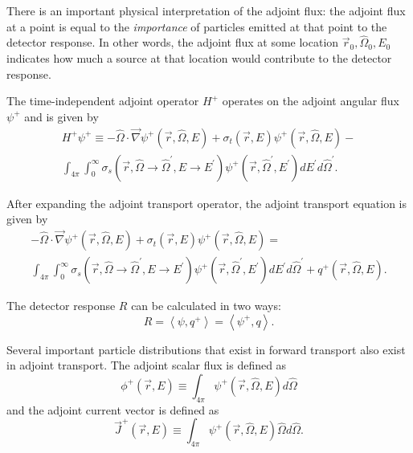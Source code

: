 There is an important physical interpretation of the adjoint flux: the adjoint flux at a point is equal to the \textit{importance} of particles emitted at that point to the detector response.
In other words, the adjoint flux at some location $\vec{r}_0, \hat{\Omega}_0, E_0$ indicates how much a source at that location would contribute to the detector response.

The time-independent adjoint operator $H^+$ operates on the adjoint angular flux $\psi^+$ and is given by
\begin{multline}\label{eq:bg:rt:transport-operator}
  H^+\psi^+ \equiv
  -\hat{\Omega}\cdot\vec{\nabla}\psi^+\left(\vec{r},\hat{\Omega},E\right) +
  \sigma_t\left(\vec{r},E\right)\psi^+\left(\vec{r},\hat{\Omega},E\right) - \\
  \int_{4\pi}\int_0^\infty\sigma_s\left(\vec{r},\hat{\Omega}\rightarrow\hat{\Omega}^\prime,E\rightarrow E^\prime\right)\psi^+\left(\vec{r},\hat{\Omega}^\prime,E^\prime\right)dE^\prime d\hat{\Omega}^\prime.
\end{multline}

After expanding the adjoint transport operator, the adjoint transport equation is given by
\begin{multline}\label{eq:bg:rt:adjoint-transport}
  -\hat{\Omega}\cdot\vec{\nabla}\psi^+\left(\vec{r},\hat{\Omega},E\right) +
  \sigma_t\left(\vec{r},E\right)\psi^+\left(\vec{r},\hat{\Omega},E\right) = \\
  \int_{4\pi}\int_0^\infty\sigma_s\left(\vec{r},\hat{\Omega}\rightarrow\hat{\Omega}^\prime,E\rightarrow E^\prime\right)\psi^+\left(\vec{r},\hat{\Omega}^\prime,E^\prime\right)dE^\prime d\hat{\Omega}^\prime +
  q^+\left(\vec{r},\hat{\Omega},E\right).
\end{multline}

The detector response $R$ can be calculated in two ways:
\begin{equation}\label{eq:bg:rt:detector-response}
  R = \left<\psi,q^+\right>
    = \left<\psi^+,q\right>.
\end{equation}

Several important particle distributions that exist in forward transport also exist in adjoint transport.
The adjoint scalar flux is defined as
\begin{equation}\label{eq:bg:rt:scalar-flux}
  \phi^+\left(\vec{r},E\right) \equiv
  \int_{4\pi}\psi^+\left(\vec{r},\hat{\Omega},E\right)d\hat{\Omega}
\end{equation}
and the adjoint current vector is defined as
\begin{equation}\label{eq:bg:rt:current-vector}
  \vec{J}^+\left(\vec{r},E\right) \equiv
  \int_{4\pi}\psi^+\left(\vec{r},\hat{\Omega},E\right)\hat{\Omega} d\hat{\Omega}.
\end{equation}


